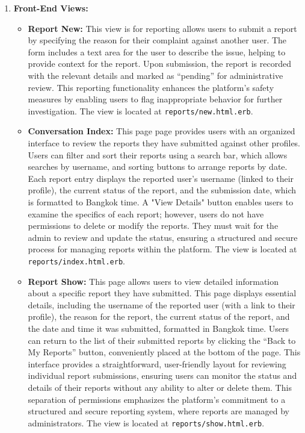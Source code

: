 \begin{enumerate}
    \newpage
    \item \textbf{Front-End Views:}
    \begin{itemize}
        \item \textbf{Report New:} 
        This view is for reporting allows users to submit a report by specifying the reason for their complaint against another user. The form includes a text area for the user to describe the issue, helping to provide context for the report. Upon submission, the report is recorded with the relevant details and marked as “pending” for administrative review. This reporting functionality enhances the platform’s safety measures by enabling users to flag inappropriate behavior for further investigation. The view is located at \texttt{reports/new.html.erb}.
        
        \item \textbf{Conversation Index:}  
        This page page provides users with an organized interface to review the reports they have submitted against other profiles. Users can filter and sort their reports using a search bar, which allows searches by username, and sorting buttons to arrange reports by date. Each report entry displays the reported user's username (linked to their profile), the current status of the report, and the submission date, which is formatted to Bangkok time. A "View Details" button enables users to examine the specifics of each report; however, users do not have permissions to delete or modify the reports. They must wait for the admin to review and update the status, ensuring a structured and secure process for managing reports within the platform. The view is located at \texttt{reports/index.html.erb}.

        \item \textbf{Report Show:} 
        This page allows users to view detailed information about a specific report they have submitted. This page displays essential details, including the username of the reported user (with a link to their profile), the reason for the report, the current status of the report, and the date and time it was submitted, formatted in Bangkok time. Users can return to the list of their submitted reports by clicking the “Back to My Reports” button, conveniently placed at the bottom of the page. This interface provides a straightforward, user-friendly layout for reviewing individual report submissions, ensuring users can monitor the status and details of their reports without any ability to alter or delete them. This separation of permissions emphasizes the platform’s commitment to a structured and secure reporting system, where reports are managed by administrators. The view is located at \texttt{reports/show.html.erb}.
        \end{itemize}\bigskip
    \end{enumerate}
    \newpage 
